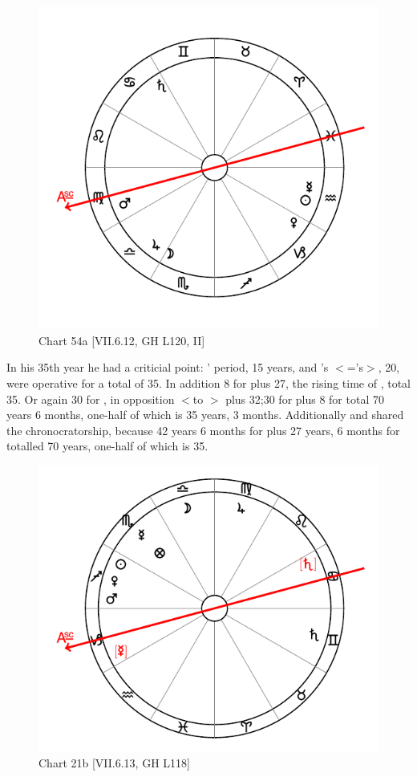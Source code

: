 \begin{figure}
\centering
\vspace{-20pt}
\includegraphics[width=.68\textwidth]{charts/5_09_1}
\caption{Chart 54a [VII.6.12, GH L120, II] }
\label{fig:chart54a}
\end{figure} 

In his 35th year he had a criticial point: \Mars’ period, 15 years, and \Virgo’s $<$=\Mercury’s$>$, 20, were operative for a total of 35. In addition 8 for \Venus\xspace plus 27, the rising time of \Capricorn, total 35. Or again 30 for \Saturn, in opposition $<$to \Venus$>$
plus 32;30 for \Cancer\xspace plus 8 for \Venus\xspace total 70 years 6 months, one-half of which is 35 years, 3 months. Additionally \Jupiter\xspace and \Saturn\xspace shared the chronocratorship, because 42 years 6 months for \Libra\xspace plus 27 years, 6 months for \Cancer\xspace totalled 70 years, one-half of which is 35.

\newpage
\begin{figure}
\centering
\vspace{0pt}
\includegraphics[width=.68\textwidth]{charts/2_36_2}
\caption{Chart 21b [VII.6.13, GH L118] }
\label{fig:chart21b}
\end{figure} 

